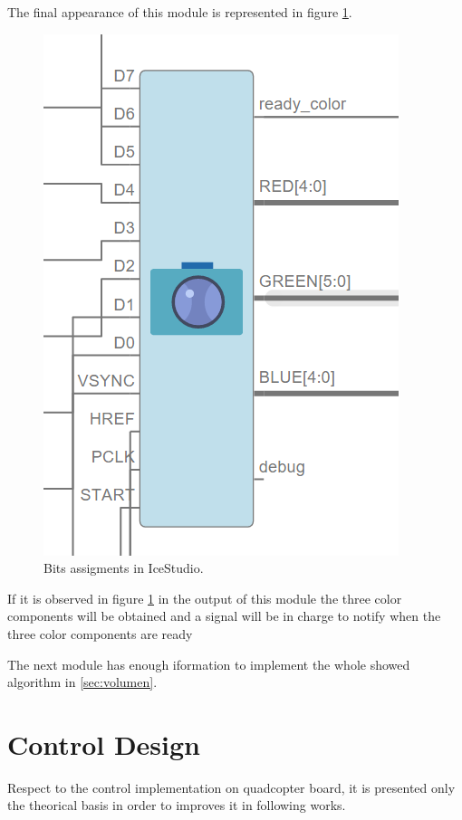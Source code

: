 	The final appearance of this module is represented in figure \ref{fig:assign_bits}.
	
		\begin{figure}[H]
		\center
		\includegraphics[scale=0.6, angle=0]{imagenes/Cuadricoptero_vision/assign_bits}
		\caption{Bits assigments in IceStudio.}
		\label{fig:assign_bits}
	\end{figure}
	
 
 	 If it is observed in figure \ref{fig:assign_bits} in the output of this module the three color components will be obtained and a signal will be in charge to notify when the three color components are ready\newline
	
	The next module has enough iformation to implement the whole showed algorithm in \ref{sec:volumen}.

\section{Control Design}

Respect to the control implementation on quadcopter board, it is presented only the theorical basis in order to improves it in following works. 

